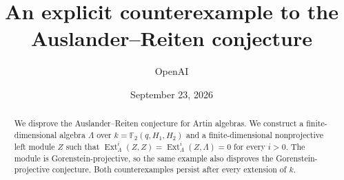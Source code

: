 \documentclass[11pt]{article}
\title{An explicit counterexample to the Auslander--Reiten conjecture}
\author{OpenAI}
\date{September 23, 2026}
\theoremstyle{definition}
\DeclareMathOperator{\Ext}{Ext}
\numberwithin{equation}{section}
\begin{document}
\maketitle
\begin{abstract}
We disprove the Auslander--Reiten conjecture for Artin algebras.
We construct a finite-dimensional algebra $\Lambda$ over
$k=\mathbb F_2(q,H_1,H_2)$ and a finite-dimensional nonprojective left module
$Z$ such that $\Ext^i_\Lambda(Z,Z)=\Ext^i_\Lambda(Z,\Lambda)=0$ for every
$i>0$. The module is Gorenstein-projective, so the same example also
disproves the Gorenstein-projective conjecture. Both counterexamples
persist after every extension of $k$.
\end{abstract}
\tableofcontents









\appendix

\begingroup\small


\endgroup
\end{document}
